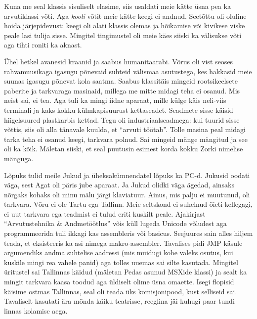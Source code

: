 Kuna me seal klassis sisuliselt elasime, siis usaldati meie kätte üsna pea ka arvutiklassi võti. Aga \emph{kooli} võtit meie kätte keegi ei andnud. Seetõttu oli oluline hoida järjepidevust: keegi oli alati klassis olemas ja hõikamise või kivikese viske peale lasi tulija sisse. Mingitel tingimustel oli meie käes siiski ka välisukse võti aga tihti roniti ka aknast. 

Ühel hetkel avanesid kraanid ja saabus humanitaarabi. Võrus oli vist seoses rahvamuusikaga igasugu põnevaid suhteid välismaa asutustega, kes hakkasid meie suunas igasugu põnevat kola saatma. Saabus klassitäis mingeid rootsikeelsete paberite ja tarkvaraga masinaid, millega me mitte midagi teha ei osanud. Mis neist sai, ei tea. Aga tuli ka mingi iidne aparaat, mille külge käis neli-viis terminali ja kaks kokku külmkapisuurust kettaseadet. Seadmete sisse käisid hiigelsuured plastkarbis kettad. Tegu oli industriaalseadmega: kui tuurid sisse võttis, siis oli alla tänavale kuulda, et \enquote{arvuti töötab}. Tolle masina peal midagi tarka teha ei osanud keegi, tarkvara polnud. Sai mingeid mänge mängitud ja see oli ka kõik. Mäletan siiski, et seal puutusin esimest korda kokku Zorki nimelise mänguga.

Lõpuks tulid meile Jukud ja üheksakümnendatel lõpuks ka PC-d. Jukusid oodati väga, sest Agat oli päris jube aparaat. Ja Jukud olidki väga ägedad, ainsaks nõrgaks kohaks oli minu mälu järgi klaviatuur. Ainus, mis palju ei muutunud, oli tarkvara. Võru ei ole Tartu ega Tallinn. Meie seltskond ei suhelnud õieti kellegagi, ei uut tarkvara ega teadmist ei tulud eriti kuskilt peale. Ajakirjast \enquote{Arvutustehnika \& Andmetöötlus} võis küll lugeda Unicode võludest aga programmeerida tuli ikkagi kas assembleris või basicus. Seejuures sain alles hiljem teada, et eksisteeris ka asi nimega makro-assembler. Tavalises pidi JMP käsule argumendiks andma suhtelise aadressi (mis muidugi kohe valeks osutus, kui kuskile mingi rea vahele panid) aga tolles uuemas sai silte kasutada. Mingitel üritustel sai Tallinnas käidud (mäletan Pedas asunud MSXide klassi) ja sealt ka mingit tarkvara kaasa toodud aga üldiselt olime üsna omaette. Isegi flopisid käisime ostmas Tallinnas, seal oli teada üks komisjonipood, kust selliseid sai. Tavaliselt kasutati ära mõnda käiku teatrisse, reeglina jäi kuhugi paar tundi linnas kolamise aega. 

